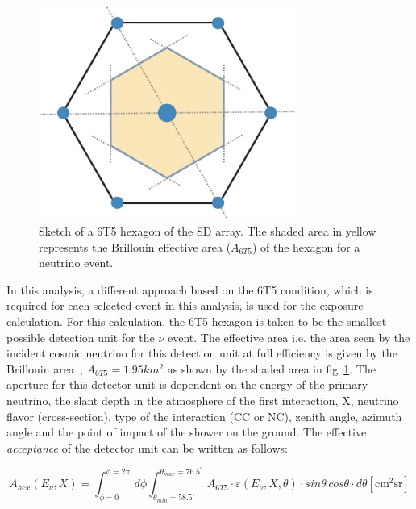 \begin{figure}[t!]
  \centering
  \includegraphics[width=0.75\textwidth]{thesis_figures/ExpLimits/Brillouin_area.png}
  \caption{Sketch of a 6T5 hexagon of the SD array. The shaded area in yellow represents the Brillouin effective area ($A_{6T5}$) of the hexagon for a neutrino event.}
  \label{fig:Brillouin_area}
\end{figure}

In this analysis, a different approach based on the 6T5 condition, which is required for each selected event in this analysis, is used for the exposure calculation. For this calculation, the 6T5 hexagon is taken to be the smallest possible detection unit for the $\nu$ event. The effective area i.e. the area seen by the incident cosmic neutrino for this detection unit at full efficiency is given by the Brillouin area~\cite{PierreAuger:2010zof}, $A_{6T5} = 1.95km^2$ as shown by the shaded area in fig~\ref{fig:Brillouin_area}. The aperture for this detector unit is dependent on the energy of the primary neutrino, the slant depth in the atmosphere of the first interaction, X, neutrino flavor (cross-section), type of the interaction (CC or NC), zenith angle, azimuth angle and the point of impact of the shower on the ground. The effective \textit{acceptance} of the detector unit can be written as follows:

\begin{equation}
  \label{eq:nu_accep}
  A_{hex}(E_{\nu}, X)  = \int^{\phi = 2\pi}_{\phi = 0} \,d\phi \int_{\theta_{min} = 58.5^{\circ}}^{\theta_{max}= 76.5^{\circ}}  \, A_{6T5} \cdot \varepsilon(E_{\nu}, X, \theta) \cdot sin\theta \, cos\theta \cdot d\theta    \mathrm{[cm^2 sr]}
\end{equation}

